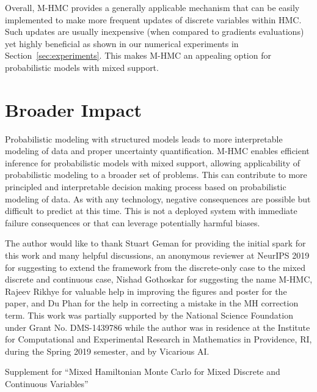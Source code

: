 \documentclass{article}
\begin{document}
Overall, M-HMC provides a generally applicable mechanism that can be easily implemented to make more frequent updates of discrete variables within HMC. Such updates are usually inexpensive (when compared to gradients evaluations) yet highly beneficial as shown in our numerical experiments in Section~\ref{sec:experiments}. This makes M-HMC an appealing option for probabilistic models with mixed support.


\clearpage


\section*{Broader Impact}

Probabilistic modeling with structured models leads to more interpretable modeling of data and proper uncertainty quantification. M-HMC enables efficient inference for probabilistic models with mixed support, allowing applicability of probabilistic modeling to a broader set of problems. This can contribute to more principled and interpretable decision making process based on probabilistic modeling of data. As with any technology, negative consequences are possible but difficult to predict at this time. This is not a deployed system with immediate failure consequences or that can leverage potentially harmful biases.

\begin{ack}
    The author would like to thank Stuart Geman for providing the initial spark for this work and many helpful discussions, an anonymous reviewer at NeurIPS 2019 for suggesting to extend the framework from the discrete-only case to the mixed discrete and continuous case, Nishad Gothoskar for suggesting the name M-HMC, Rajeev Rikhye for valuable help in improving the figures and poster for the paper, and Du Phan for the help in correcting a mistake in the MH correction term. This work was partially supported by the National Science Foundation under Grant No. DMS-1439786 while the author was in residence at the Institute for Computational and Experimental Research in Mathematics in Providence, RI, during the Spring 2019 semester, and by Vicarious AI.
\end{ack}

\appendix
\renewcommand\thesection{\arabic{section}}
\setcounter{theorem}{0}
\setcounter{algorithm}{0}
\begin{center}
    \LARGE Supplement for ``Mixed Hamiltonian Monte Carlo for Mixed Discrete and Continuous Variables''
\end{center}
\end{document}
